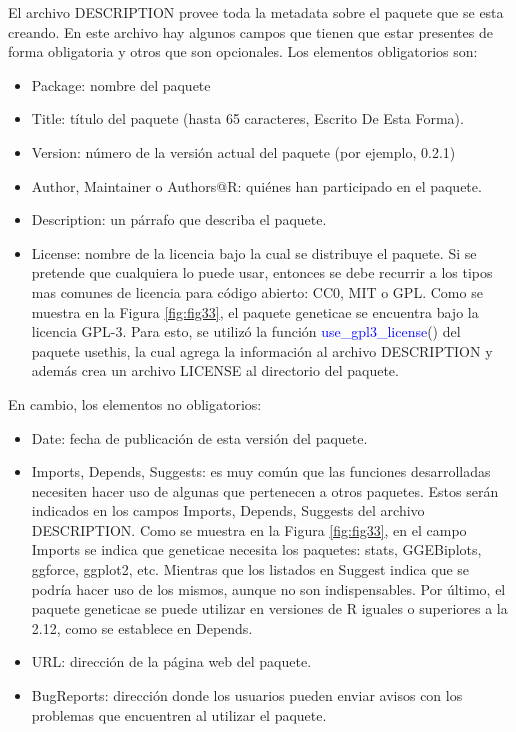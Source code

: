 El archivo DESCRIPTION provee toda la metadata sobre el paquete que se esta creando. En este archivo hay algunos campos que tienen que estar presentes de forma obligatoria y otros que son opcionales. Los elementos obligatorios son:

\begin{itemize}
\item Package: nombre del paquete
\item Title: título del paquete (hasta 65 caracteres, Escrito De Esta Forma).
\item Version: número de la versión actual del paquete (por ejemplo, 0.2.1)
\item Author, Maintainer o Authors@R: quiénes han participado en el paquete.
\item Description: un párrafo que describa el paquete.
\item License: nombre de la licencia bajo la cual se distribuye el paquete. Si se pretende que cualquiera lo puede usar, entonces se debe recurrir a los tipos mas comunes de licencia para código abierto: CC0, MIT o GPL. Como se muestra en la Figura \ref{fig:fig33}, el paquete geneticae se encuentra bajo la licencia GPL-3. Para esto, se utilizó la función \textcolor{blue}{use\_gpl3\_license}() del paquete usethis, la cual agrega la información al archivo DESCRIPTION y además crea un archivo LICENSE al directorio del paquete.
\end{itemize}




En cambio, los elementos no obligatorios:
\begin{itemize}
\item Date: fecha de publicación de esta versión del paquete.
\item Imports, Depends, Suggests: es muy común que las funciones desarrolladas necesiten hacer uso de algunas que pertenecen a otros paquetes. Estos serán indicados en los campos Imports, Depends, Suggests del archivo DESCRIPTION. Como se muestra en la Figura \ref{fig:fig33}, en el campo Imports se indica que geneticae necesita los paquetes: stats, GGEBiplots, ggforce, ggplot2, etc. Mientras que los listados en Suggest indica que se podría hacer uso de los mismos, aunque no son indispensables. Por último, el paquete geneticae se puede utilizar en versiones de R iguales o superiores a la 2.12, como se establece en Depends.
\item URL: dirección de la página web del paquete.
\item BugReports: dirección donde los usuarios pueden enviar avisos con los problemas que encuentren al utilizar el paquete.
\end{itemize}

